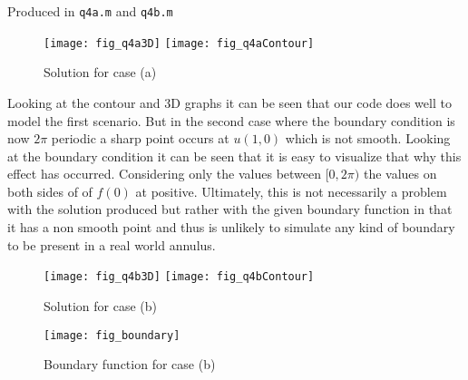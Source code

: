\documentclass{article}
\begin{document}
\begin{enumerate}
	Produced in \texttt{q4a.m} and \texttt{q4b.m}
	
	\begin{figure}[h!]
		\centering
		\texttt{[image: fig\_q4a3D]}
		\texttt{[image: fig\_q4aContour]}
		\caption{Solution for case (a)}
	\end{figure}
	

	Looking at the contour and 3D graphs it can be seen that our code does well to model the first scenario. But in the second case where the boundary condition is now $2\pi$ periodic a sharp point occurs at $u(1,0)$ which is not smooth. Looking at the boundary condition it can be seen that it is easy to visualize that why this effect has occurred. Considering only the values between $[0,2\pi)$ the values on both sides of of $f(0)$ at positive. Ultimately, this is not necessarily a problem with the solution produced but rather with the given boundary function in that it has a non smooth point and thus is unlikely to simulate any kind of boundary to be present in a real world annulus.

	\begin{figure}[h!]
		\centering
		\texttt{[image: fig\_q4b3D]}
		\texttt{[image: fig\_q4bContour]}
		\caption{Solution for case (b)}
	\end{figure}
	
	\begin{figure}[h!]
		\centering
		\texttt{[image: fig\_boundary]}
		\caption{Boundary function for case (b)}
	\end{figure}
	
	
\end{enumerate}

%
%
\end{document}
